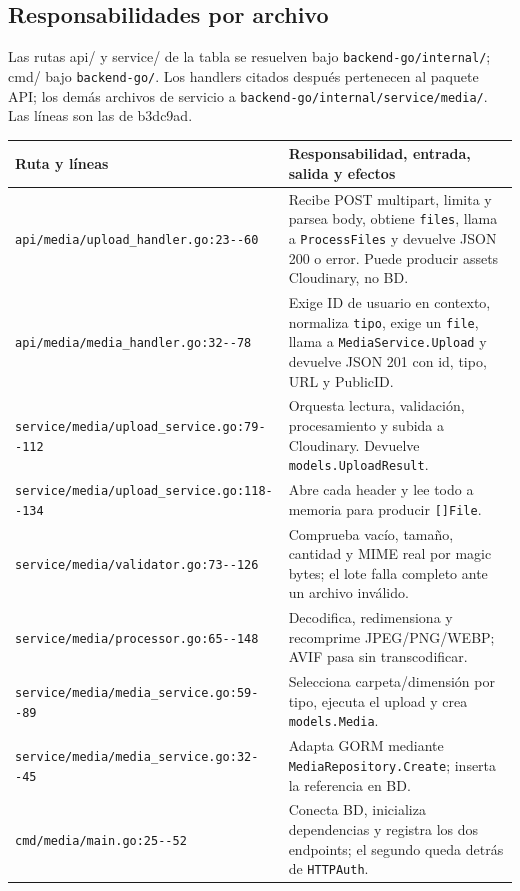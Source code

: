 \documentclass[11pt,a4paper]{article}
\begin{document}
\subsection{Responsabilidades por archivo}
Las rutas api/ y service/ de la tabla se resuelven bajo \nolinkurl{backend-go/internal/}; cmd/ bajo \nolinkurl{backend-go/}. Los handlers citados después pertenecen al paquete API; los demás archivos de servicio a \nolinkurl{backend-go/internal/service/media/}. Las líneas son las de b3dc9ad.
\begin{longtable}{>{\raggedright\arraybackslash}p{}>{\raggedright\arraybackslash}p{}}
\toprule
Ruta y líneas & Responsabilidad, entrada, salida y efectos\\ \midrule
\nolinkurl{api/media/upload_handler.go:23--60} & Recibe POST multipart, limita y parsea body, obtiene \nolinkurl{files}, llama a \nolinkurl{ProcessFiles} y devuelve JSON 200 o error. Puede producir assets Cloudinary, no BD.\\
\nolinkurl{api/media/media_handler.go:32--78} & Exige ID de usuario en contexto, normaliza \nolinkurl{tipo}, exige un \nolinkurl{file}, llama a \nolinkurl{MediaService.Upload} y devuelve JSON 201 con id, tipo, URL y PublicID.\\
\nolinkurl{service/media/upload_service.go:79--112} & Orquesta lectura, validación, procesamiento y subida a Cloudinary. Devuelve \nolinkurl{models.UploadResult}.\\
\nolinkurl{service/media/upload_service.go:118--134} & Abre cada header y lee todo a memoria para producir \nolinkurl{[]File}.\\
\nolinkurl{service/media/validator.go:73--126} & Comprueba vacío, tamaño, cantidad y MIME real por magic bytes; el lote falla completo ante un archivo inválido.\\
\nolinkurl{service/media/processor.go:65--148} & Decodifica, redimensiona y recomprime JPEG/PNG/WEBP; AVIF pasa sin transcodificar.\\
\nolinkurl{service/media/media_service.go:59--89} & Selecciona carpeta/dimensión por tipo, ejecuta el upload y crea \nolinkurl{models.Media}.\\
\nolinkurl{service/media/media_service.go:32--45} & Adapta GORM mediante \nolinkurl{MediaRepository.Create}; inserta la referencia en BD.\\
\nolinkurl{cmd/media/main.go:25--52} & Conecta BD, inicializa dependencias y registra los dos endpoints; el segundo queda detrás de \nolinkurl{HTTPAuth}.\\
\bottomrule
\end{longtable}
\end{document}
